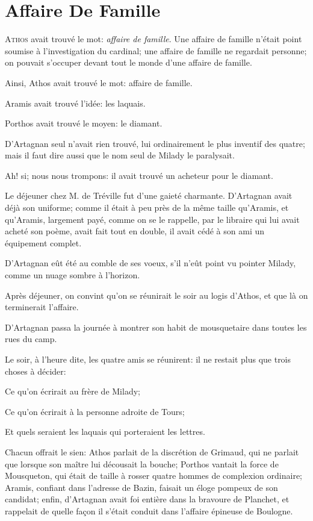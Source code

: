 
\chapter{Affaire De Famille}

\lettrine{A}{thos} avait trouvé le mot: \textit{affaire de famille}. Une affaire de famille n'était point soumise à l'investigation du cardinal; une affaire de famille ne regardait personne; on pouvait s'occuper devant tout le monde d'une affaire de famille. 

Ainsi, Athos avait trouvé le mot: affaire de famille. 

Aramis avait trouvé l'idée: les laquais. 

Porthos avait trouvé le moyen: le diamant. 

D'Artagnan seul n'avait rien trouvé, lui ordinairement le plus inventif des quatre; mais il faut dire aussi que le nom seul de Milady le paralysait. 

Ah! si; nous nous trompons: il avait trouvé un acheteur pour le diamant. 

Le déjeuner chez M. de Tréville fut d'une gaieté charmante. D'Artagnan avait déjà son uniforme; comme il était à peu près de la même taille qu'Aramis, et qu'Aramis, largement payé, comme on se le rappelle, par le libraire qui lui avait acheté son poème, avait fait tout en double, il avait cédé à son ami un équipement complet. 

D'Artagnan eût été au comble de ses voeux, s'il n'eût point vu pointer Milady, comme un nuage sombre à l'horizon. 

Après déjeuner, on convint qu'on se réunirait le soir au logis d'Athos, et que là on terminerait l'affaire. 

D'Artagnan passa la journée à montrer son habit de mousquetaire dans toutes les rues du camp. 

Le soir, à l'heure dite, les quatre amis se réunirent: il ne restait plus que trois choses à décider: 

Ce qu'on écrirait au frère de Milady; 

Ce qu'on écrirait à la personne adroite de Tours; 

Et quels seraient les laquais qui porteraient les lettres. 

Chacun offrait le sien: Athos parlait de la discrétion de Grimaud, qui ne parlait que lorsque son maître lui décousait la bouche; Porthos vantait la force de Mousqueton, qui était de taille à rosser quatre hommes de complexion ordinaire; Aramis, confiant dans l'adresse de Bazin, faisait un éloge pompeux de son candidat; enfin, d'Artagnan avait foi entière dans la bravoure de Planchet, et rappelait de quelle façon il s'était conduit dans l'affaire épineuse de Boulogne. 


